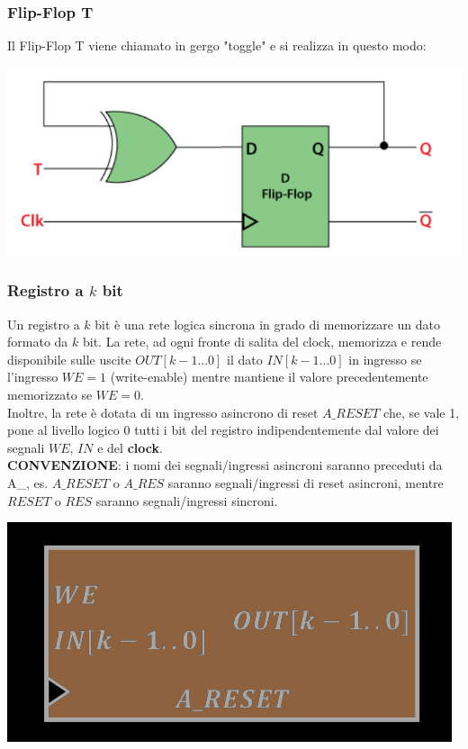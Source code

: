 \documentclass{article}
\begin{document}
\subsubsection{Flip-Flop T}
Il Flip-Flop T viene chiamato in gergo "toggle" e si realizza in questo modo:
\begin{center}
    \includegraphics[scale=0.4]{flip-flop t.png}
\end{center}



\subsubsection{Registro a $k$ bit}
Un registro a $k$ bit è una rete logica sincrona in grado di memorizzare un dato formato da $k$ bit. La rete, ad ogni fronte di salita del clock, memorizza e rende disponibile sulle uscite $OUT[k-1...0]$ il dato $IN[k-1...0]$ in ingresso se l'ingresso $WE=1$ (write-enable) mentre mantiene il valore precedentemente memorizzato se $WE =0$.\\
Inoltre, la rete è dotata di un ingresso asincrono di reset $A\_RESET$ che, se vale 1, pone al livello logico 0 tutti i bit del registro indipendentemente dal valore dei segnali $WE$, $IN$ e del \textbf{clock}.
\vspace{0.1cm}\\
\textbf{CONVENZIONE}: i nomi dei segnali/ingressi asincroni saranno preceduti da A\_, es. $A\_RESET$ o $A\_RES$ saranno segnali/ingressi di reset asincroni, mentre $RESET$ o $RES$ saranno segnali/ingressi sincroni.
\begin{center}
    \includegraphics[scale=0.35]{registro k.png}
\end{center}
\end{document}
